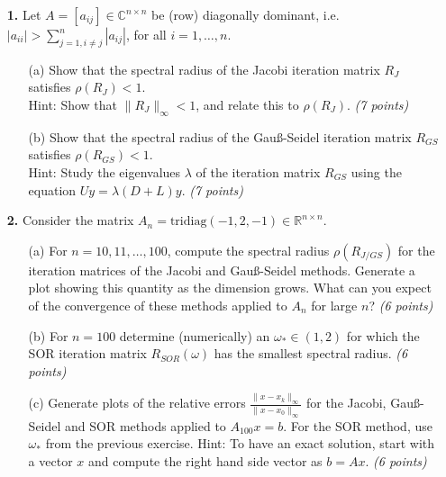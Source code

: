 \documentclass[10pt]{report}
\begin{document}
\begin{enumerate}
    
  \item[\textbf{1.}] Let $A=[a_{ij}]\in\mathbb{C}^{n\times n}$ be (row) diagonally dominant, i.e. $|a_{ii}|>\sum_{j=1,i\neq j}^n|a_{ij}|$, for all $i=1,\ldots,n$.
  \begin{enumerate}
    \item[(a)] Show that the spectral radius of the Jacobi iteration matrix $R_J$ satisfies  $\rho(R_J) <1$.\\
    Hint: Show that $\|R_J\|_{\infty}<1$, and relate this to $\rho(R_J)$. \textit{(7 points)}

    \item[(b)] Show that the spectral radius of the Gau\ss-Seidel iteration matrix $R_{GS}$ satisfies $\rho(R_{GS}) <1$.\\
Hint: Study the eigenvalues $\lambda$ of the iteration matrix
      $R_{GS}$ using the equation $Uy=\lambda(D+L)y$. \linebreak 
\textit{(7 points)}
\end{enumerate}

\vspace{0.1cm} 

\item[\textbf{2.}] Consider the matrix $A_n=\text{tridiag}(-1,2,-1)\in\mathbb{R}^{n\times n}$.
  \begin{enumerate}
    \item[(a)] For  $n=10,11,\ldots,100$, compute the spectral radius $\rho(R_{J/GS})$ for the iteration matrices of the Jacobi and Gau\ss-Seidel methods. Generate a plot showing this quantity as the dimension grows. What can you expect of the convergence  of these methods applied to $A_n$ for large $n$? \textit{(6 points)}

    \item[(b)] For $n=100$ determine (numerically) an $\omega_*\in(1,2)$ for which the SOR iteration matrix $R_{SOR}(\omega)$ has the smallest spectral radius. \textit{(6 points)}


    \item[(c)] Generate plots of the relative errors $\frac{\|x-x_k\|_{\infty}}{\|x-x_0\|_{\infty}}$ for the Jacobi, Gau\ss-Seidel and SOR methods applied to $A_{100}x=b$. For the SOR method, use $\omega_*$ from the previous exercise. Hint: To have an exact solution, start with a vector $x$ and compute the right hand side vector as $b=Ax$.  \textit{(6 points)} 
\end{enumerate}
\vspace{0.1cm} 



\end{enumerate}
\end{document}
